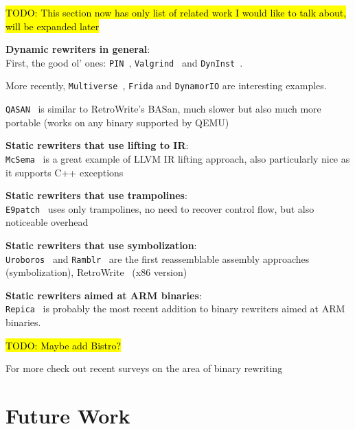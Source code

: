 \documentclass[a4paper,11pt,oneside]{report}
\newcommand{\sysname}{RetroWrite\xspace}
\DeclareRobustCommand{\todo}[1]{{\sethlcolor{cyan}\hl{TODO: #1}}}
\begin{document}
{

\setlength{\parindent}{0cm}

\todo{This section now has only list of related work I would like to talk 
about, will be expanded later}



\textbf{Dynamic rewriters in general}:\\
First, the good ol' ones: \texttt{PIN}~\cite{pin}, 
\texttt{Valgrind}~\cite{valgrind} and \texttt{DynInst}~\cite{dyninst}.

More recently, \texttt{Multiverse}~\cite{multiverse}, \texttt{Frida} and 
\texttt{DynamorIO} are interesting examples.

\texttt{QASAN}~\cite{qasan} is similar to \sysname's BASan, much slower but 
also much more portable (works on any binary supported by QEMU)



\textbf{Static rewriters that use lifting to IR}:\\
\texttt{McSema}~\cite{mcsema} is a great example of LLVM IR lifting approach, 
also particularly nice as it supports C++ exceptions

\textbf{Static rewriters that use trampolines}:\\
\texttt{E9patch}~\cite{e9patch} uses only trampolines, no need to recover 
control flow, but also noticeable overhead


\textbf{Static rewriters that use symbolization}:\\
\texttt{Uroboros}~\cite{uroboros} and \texttt{Ramblr}~\cite{ramblr} are the 
first reassemblable assembly approaches (symbolization), 
\sysname~\cite{dinesh20oakland} (x86 version)

\textbf{Static rewriters aimed at ARM binaries}:\\
\texttt{Repica}~\cite{repica} is probably the most recent addition to binary 
rewriters aimed at ARM binaries.  

\todo{Maybe add Bistro?}~\cite{bistro}

For more check out recent surveys on the area of binary rewriting~\cite{binaryrewritingsurvey}

}

\chapter{Future Work}
\end{document}
